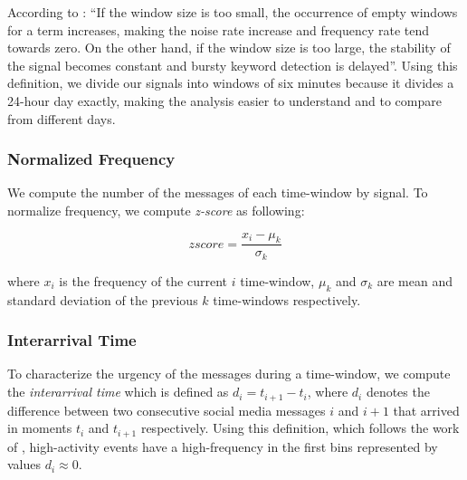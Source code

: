 \documentclass[sigconf]{acmart}
\begin{document}
According to \citeauthor{guzman2013line} \cite{guzman2013line}: ``If the window size is too small, the occurrence of empty windows for a term increases, making the noise rate increase and frequency rate tend towards zero. On the other hand, if the window size is too large, the stability of the signal becomes constant and bursty keyword detection is delayed''. Using this definition, we divide our signals into windows of six minutes because it divides a 24-hour day exactly, making the analysis easier to understand and to compare from different days.


\subsubsection{Normalized Frequency}
We compute the number of the messages of each time-window by signal. To normalize frequency, we compute \textit{z-score} as following:

\begin{equation} \label{eq:1}
zscore = \frac{x_{i} - \mu_{k} }{\sigma_{k}}
\end{equation}

where $x_{i}$ is the frequency of the current $i$ time-window, $\mu_{k}$ and  $\sigma_{k}$ are mean and standard deviation of the previous $k$ time-windows respectively.

\subsubsection{Interarrival Time}

To characterize the urgency of the messages during a time-window, we compute the \textit{interarrival time} which is defined as $d_{i} = t_{i+1} - t_{i}$, where $d_{i}$ denotes the difference between two consecutive social media messages $i$ and $i+1$ that arrived in moments $t_{i}$ and $t_{i+1}$ respectively. Using this definition, which follows the work of \citeauthor{kalyanam2016prediction} \cite{kalyanam2016prediction}, high-activity events have a high-frequency in the first bins represented by values $d_{i} \approx 0$. 
\end{document}
